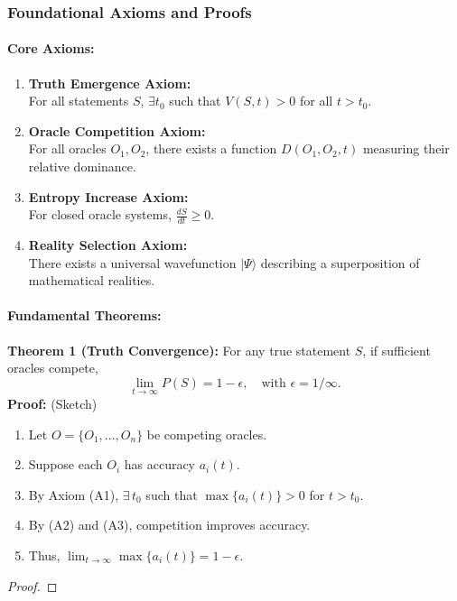 \documentclass[11pt]{article}
\begin{document}
\subsubsection{Foundational Axioms and Proofs}

\paragraph{Core Axioms:}
\begin{enumerate}[label=(A\arabic*)]
    \item \textbf{Truth Emergence Axiom:} \\
    For all statements $S$, $\exists t_0$ such that $V(S,t)>0$ for all $t>t_0$.
    \item \textbf{Oracle Competition Axiom:} \\
    For all oracles $O_1, O_2$, there exists a function $D(O_1,O_2,t)$ measuring their relative dominance.
    \item \textbf{Entropy Increase Axiom:} \\
    For closed oracle systems, $\displaystyle \frac{dS}{dt}\ge 0$.
    \item \textbf{Reality Selection Axiom:} \\
    There exists a universal wavefunction $|\Psi\rangle$ describing a superposition of mathematical realities.
\end{enumerate}

\paragraph{Fundamental Theorems:}

\textbf{Theorem 1 (Truth Convergence):} For any true statement $S$, if sufficient oracles compete,
\[
\lim_{t\to\infty} P(S)=1-\epsilon, \quad \text{with } \epsilon=1/\infty.
\]
\noindent\textbf{Proof:} (Sketch)
\begin{enumerate}[label=(\roman*)]
    \item Let $O=\{O_1,\dots, O_n\}$ be competing oracles.
    \item Suppose each $O_i$ has accuracy $a_i(t)$.
    \item By Axiom (A1), $\exists\,t_0$ such that $\max\{a_i(t)\}>0$ for $t>t_0$.
    \item By (A2) and (A3), competition improves accuracy.
    \item Thus, $\displaystyle \lim_{t\to\infty} \max\{a_i(t)\}=1-\epsilon$.
\end{enumerate}
\begin{proof}
\end{proof}
\end{document}
